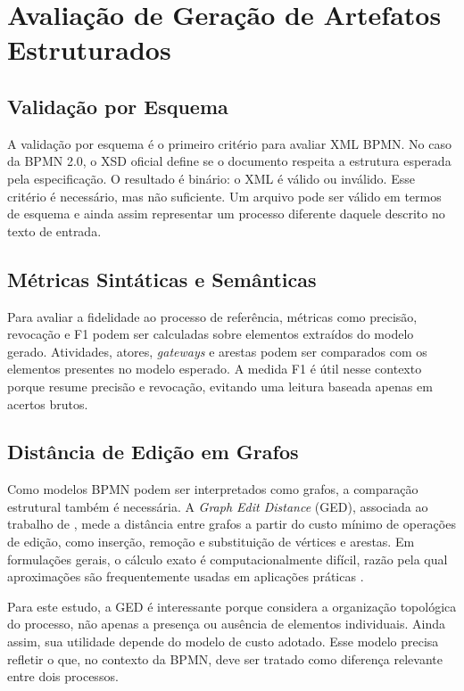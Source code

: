 \section{Avaliação de Geração de Artefatos Estruturados}
\label{sec:metricas}

\subsection{Validação por Esquema}
\label{subsec:xsd}

A validação por esquema é o primeiro critério para avaliar XML BPMN. No caso da BPMN 2.0, o XSD oficial define se o documento respeita a estrutura esperada pela especificação. O resultado é binário: o XML é válido ou inválido. Esse critério é necessário, mas não suficiente. Um arquivo pode ser válido em termos de esquema e ainda assim representar um processo diferente daquele descrito no texto de entrada.

\subsection{Métricas Sintáticas e Semânticas}
\label{subsec:precisao-recall}

Para avaliar a fidelidade ao processo de referência, métricas como precisão, revocação e F1 podem ser calculadas sobre elementos extraídos do modelo gerado. Atividades, atores, \textit{gateways} e arestas podem ser comparados com os elementos presentes no modelo esperado. A medida F1 é útil nesse contexto porque resume precisão e revocação, evitando uma leitura baseada apenas em acertos brutos.

\subsection{Distância de Edição em Grafos}
\label{subsec:ged}

Como modelos BPMN podem ser interpretados como grafos, a comparação estrutural também é necessária. A \textit{Graph Edit Distance} (GED), associada ao trabalho de , mede a distância entre grafos a partir do custo mínimo de operações de edição, como inserção, remoção e substituição de vértices e arestas. Em formulações gerais, o cálculo exato é computacionalmente difícil, razão pela qual aproximações são frequentemente usadas em aplicações práticas \cite{gao2010graph}.

Para este estudo, a GED é interessante porque considera a organização topológica do processo, não apenas a presença ou ausência de elementos individuais. Ainda assim, sua utilidade depende do modelo de custo adotado. Esse modelo precisa refletir o que, no contexto da BPMN, deve ser tratado como diferença relevante entre dois processos.

